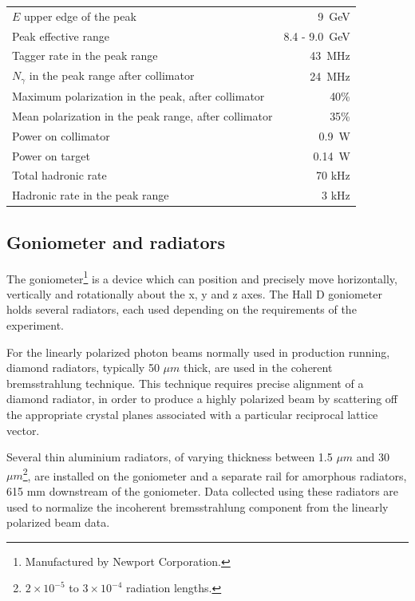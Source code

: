 \begin{table}[tbp]
\begin{center}
\begin{tabular}{|l|r|}
\hline\hline
$E$ upper edge of the peak & 9~GeV \\
Peak effective range       & 8.4 - 9.0~GeV\\
Tagger rate in the peak range & 43~MHz  \\
$N_{\gamma}$ in the peak range after collimator & 24~MHz  \\
Maximum polarization in the peak, after collimator & 40\% \\
Mean polarization in the peak range, after collimator & 35\% \\
Power on collimator & 0.9~W \\
Power on target & 0.14~W \\
Total hadronic rate & 70 kHz \\
Hadronic rate in the peak range & 3 kHz \\
\hline\hline
\end{tabular}
\end{center}
\end{table}


\subsection{Goniometer and radiators \label{sec:radiators}}
The goniometer\footnote{Manufactured by Newport Corporation.} is a device which can position and precisely move horizontally, vertically and rotationally about the x, y and z axes.
The Hall D goniometer holds several radiators, each used depending on the requirements of the experiment.

For the linearly polarized photon beams normally used in \GX{} production running, diamond radiators, typically 50 $\mu m$ thick, are used in the coherent bremsstrahlung technique.
This technique requires precise alignment of a diamond radiator, in order to produce a highly polarized beam by scattering off the appropriate crystal planes associated with a particular reciprocal lattice vector.

Several thin aluminium radiators, of varying thickness between 1.5 $\mu m$ and 30 $\mu m$\footnote{$2\times10^{-5}$ to $3\times10^{-4}$ radiation lengths.}, are installed on the goniometer and a separate rail for amorphous radiators, 615 mm downstream of the goniometer.
Data collected using these radiators are used to normalize the incoherent bremsstrahlung component from the linearly polarized beam data.

